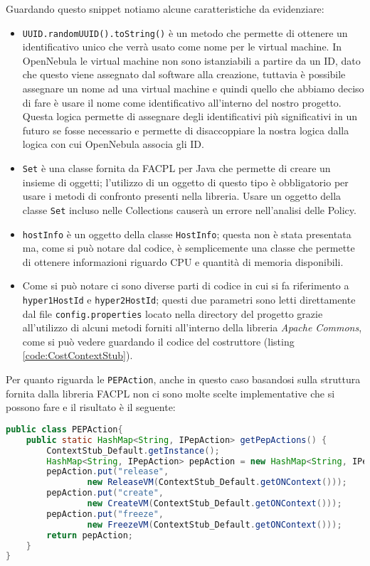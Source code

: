Guardando questo snippet notiamo alcune caratteristiche da evidenziare:
\begin{itemize}
    \item \texttt{UUID.randomUUID().toString()} è un metodo che permette di ottenere un identificativo unico che verrà usato come nome per le virtual machine. In OpenNebula le virtual machine non sono istanziabili a partire da un ID, dato che questo viene assegnato dal software alla creazione, tuttavia è possibile assegnare un nome ad una virtual machine e quindi quello che abbiamo deciso di fare è usare il nome come identificativo all'interno del nostro progetto. Questa logica permette di assegnare degli identificativi più significativi in un futuro se fosse necessario e permette di disaccoppiare la nostra logica dalla logica con cui OpenNebula associa gli ID.
    \item \texttt{Set} è una classe fornita da FACPL per Java che permette di creare un insieme di oggetti; l'utilizzo di un oggetto di questo tipo è obbligatorio per usare i metodi di confronto presenti nella libreria. Usare un oggetto della classe \texttt{Set} incluso nelle Collections causerà un errore nell'analisi delle Policy.
    \item \texttt{hostInfo} è un oggetto della classe \texttt{HostInfo}; questa non è stata presentata ma, come si può notare dal codice, è semplicemente una classe che permette di ottenere informazioni riguardo CPU e quantità di memoria disponibili.
    \item Come si può notare ci sono diverse parti di codice in cui si fa riferimento a \texttt{hyper1HostId} e \texttt{hyper2HostId}; questi due parametri sono letti direttamente dal file \texttt{config.properties} locato nella directory del progetto grazie all'utilizzo di alcuni metodi forniti all'interno della libreria \emph{Apache Commons}\cite{apache_commons}, come si può vedere guardando il codice del costruttore (listing \ref{code:CostContextStub}).
\end{itemize}

Per quanto riguarda le \texttt{PEPAction}, anche in questo caso basandosi sulla struttura fornita dalla libreria FACPL non ci sono molte scelte implementative che si possono fare e il risultato è il seguente:
\begin{lstlisting}[language=Java, caption=Classe PEPAction adattata, label=code:PEPAction]
public class PEPAction{
    public static HashMap<String, IPepAction> getPepActions() {
        ContextStub_Default.getInstance();
        HashMap<String, IPepAction> pepAction = new HashMap<String, IPepAction>();
        pepAction.put("release", 
                new ReleaseVM(ContextStub_Default.getONContext()));
        pepAction.put("create", 
                new CreateVM(ContextStub_Default.getONContext()));
        pepAction.put("freeze", 
                new FreezeVM(ContextStub_Default.getONContext()));
        return pepAction;
    }
}
\end{lstlisting}

